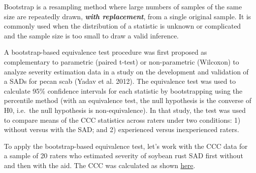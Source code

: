 \documentclass[
  letterpaper,
]{book}
\begin{document}
Bootstrap is a resampling method where large numbers of samples of the
same size are repeatedly drawn, \textbf{\emph{with replacement}}, from a
single original sample. It is commonly used when the distribution of a
statistic is unknown or complicated and the sample size is too small to
draw a valid inference.

A bootstrap-based equivalence test procedure was first proposed as
complementary to parametric (paired t-test) or non-parametric (Wilcoxon)
to analyze severity estimation data in a study on the development and
validation of a SADs for pecan scab (Yadav et al. 2012). The equivalence
test was used to calculate 95\% confidence intervals for each statistic
by bootstrapping using the percentile method (with an equivalence test,
the null hypothesis is the converse of H0, i.e.~the null hypothesis is
non-equivalence). In that study, the test was used to compare means of
the CCC statistics across raters under two conditions: 1) without versus
with the SAD; and 2) experienced versus inexperienced raters.

To apply the bootstrap-based equivalence test, let's work with the CCC
data for a sample of 20 raters who estimated severity of soybean rust
SAD first without and then with the aid. The CCC was calculated as shown
\protect\hyperlink{concordance-correlation-coefficient}{here}.
\end{document}
